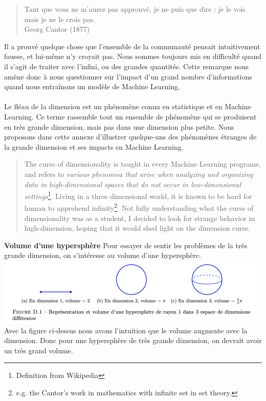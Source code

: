 \begin{quotation}
    Tant que vous ne m’aurez pas approuvé, je ne puis que dire : je le vois mais je ne le crois pas.
    \\
    Georg Cantor (1877)
\end{quotation}
Il a prouvé quelque chose que l’ensemble de la communauté pensait intuitivement fausse, et lui-même n’y croyait pas. Nous sommes toujours mis en difficulté quand il s’agit de traiter avec l’infini, ou des grandes quantités. Cette remarque nous amène donc à nous questionner sur l’impact d’un grand nombre d’informations quand nous entraînons un modèle de Machine Learning.
\\
\\
Le fléau de la dimension est un phénomène connu en statistique et en Machine Learning. Ce terme rassemble tout un ensemble de phénomène qui se produisent en très grande dimension, mais pas dans une dimension plus petite. Nous proposons dans cette annexe d’illustrer quelque-uns des phénomènes étranges de la grande dimension et ses impacts en Machine Learning.
\begin{quotation}
    The curse of dimensionality is taught in every Machine Learning programs, and refers to \textit{various phenomea that arise when analyzing and organizing data in high-dimensional spaces that do not occur in low-dimensional settings}\footnote{Definition from Wikipedia}. Living in a three dimensional world, it is known to be hard for human to apprehend infinity\footnote{e.g. the Cantor's work in mathematics with infinite set in set theory.}. Not fully understanding what the curse of dimensionality was as a student, I decided to look for strange behavior in high-dimension, hoping that it would shed light on the dimension curse.
\end{quotation}
\textbf{Volume d’une hypersphère}
Pour essayer de sentir les problèmes de la très grande dimension, on s’intéresse au volume d’une hypersphère.
\\
\includegraphics[width=\linewidth]{./img/notions_math/hypersphere_1}
\\
Avec la figure ci-dessus nous avons l’intuition que le volume augmente avec la dimension. Donc pour une hypersphère de très grande dimension, on devrait avoir un très grand volume.
